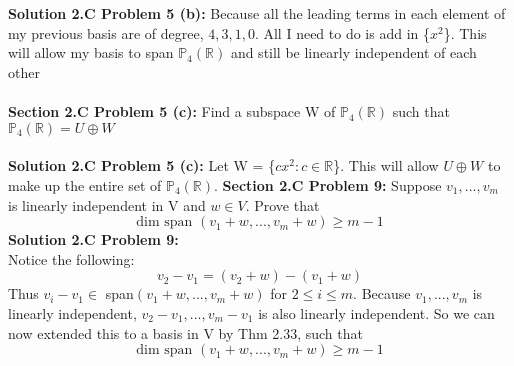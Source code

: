 \documentclass[12pt]{article}
\begin{document}
\\\\
\noindent \textbf{Solution 2.C Problem 5 (b): } Because all the leading terms in each element of my previous basis are of degree, $4, 3, 1, 0$.  All I need to do is add in \{$x^2$\}.  This will allow my basis to span $\mathbb{P}_4(\mathbb{R})$ and still be linearly independent of each other
\\\\
\noindent \textbf{Section 2.C Problem 5 (c): } Find a subspace W of $\mathbb{P}_4(\mathbb{R})$ such that $\mathbb{P}_4(\mathbb{R}) = U \oplus W$ 
\\\\
\noindent \textbf{Solution 2.C Problem 5 (c): } Let W = \{$cx^2 : c \in \mathbb{R}$\}.  This will allow $U \oplus W$ to make up the entire set of $\mathbb{P}_4(\mathbb{R})$.
\newpage
\noindent \textbf{Section 2.C Problem 9: } Suppose $v_1,...,v_m$ is linearly independent in V and $w \in V$.  Prove that 
$$\text{dim span }(v_1 + w,...,v_m + w) \geq m-1$$
\noindent \textbf{Solution 2.C Problem 9: } \\
Notice the following: 
		$$v_2 - v_1 = (v_2 + w) - (v_1 + w)$$
Thus $v_i - v_1 \in$ span$(v_1 + w,...,v_m + w)$ for $2 \leq i \leq m$.
Because $v_1,...,v_m$ is linearly independent, $v_2 - v_1, ..., v_m - v_1$ is also linearly independent.  So we can now extended this to a basis in V by Thm 2.33, such that 
$$\text{dim span }(v_1 + w,...,v_m + w) \geq m-1$$
\end{document}
